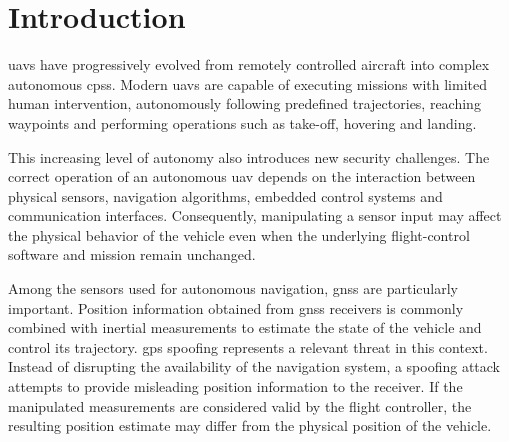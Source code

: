 \section{Introduction}
\glspl{uav} have progressively evolved from remotely controlled aircraft into complex autonomous \glspl{cps}.
Modern \glspl{uav} are capable of executing missions with limited human intervention, autonomously following predefined trajectories, reaching waypoints and performing operations such as take-off, hovering and landing.

This increasing level of autonomy also introduces new security challenges. The correct operation of an autonomous \gls{uav} depends on the interaction between physical sensors, navigation algorithms, embedded control systems and communication interfaces.
Consequently, manipulating a sensor input may affect the physical behavior of the vehicle even when the underlying flight-control software and mission remain unchanged.

Among the sensors used for autonomous navigation, \gls{gnss} are particularly important. Position information obtained from \gls{gnss} receivers is commonly combined with inertial measurements to estimate the state of the vehicle and control its trajectory.
\gls{gps} spoofing represents a relevant threat in this context. Instead of disrupting the availability of the navigation system, a spoofing attack attempts to provide misleading position information to the receiver.
If the manipulated measurements are considered valid by the flight controller, the resulting position estimate may differ from the physical position of the vehicle.